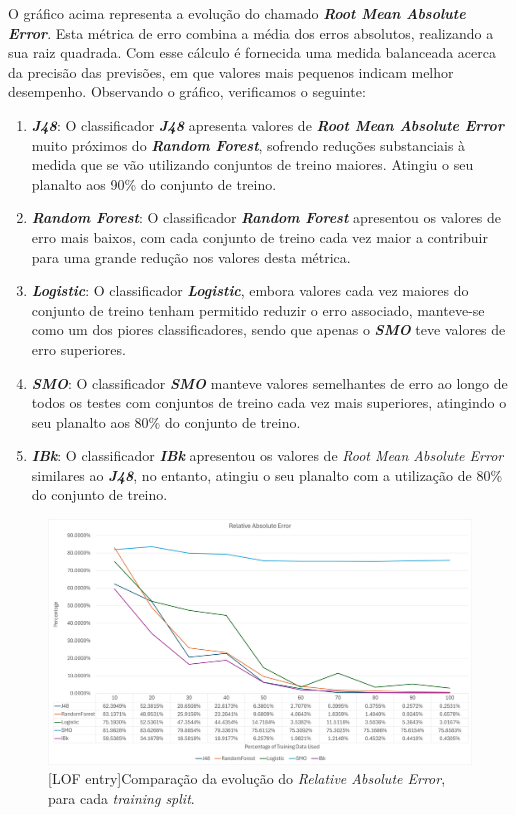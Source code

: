 \documentclass{easychair}
\begin{document}
O gráfico acima representa a evolução do chamado \textit{\textbf{Root Mean Absolute Error}}. Esta métrica de erro combina a média dos erros absolutos, realizando a sua raiz quadrada. Com esse cálculo é fornecida uma medida balanceada acerca da precisão das previsões, em que valores mais pequenos indicam melhor desempenho. Observando o gráfico, verificamos o seguinte:

\begin{enumerate}
	\item \textbf{\textit{J48}}: O classificador \textit{\textbf{J48}} apresenta valores de \textit{\textbf{Root Mean Absolute Error}} muito próximos do \textit{\textbf{Random Forest}}, sofrendo reduções substanciais à medida que se vão utilizando conjuntos de treino maiores. Atingiu o seu planalto aos 90\% do conjunto de treino.
	\item \textbf{\textit{Random Forest}}: O classificador \textit{\textbf{Random Forest}} apresentou os valores de erro mais baixos, com cada conjunto de treino cada vez maior a contribuir para uma grande redução nos valores desta métrica.
	\item \textbf{\textit{Logistic}}: O classificador \textit{\textbf{Logistic}}, embora valores cada vez maiores do conjunto de treino tenham permitido reduzir o erro associado, manteve-se como um dos piores classificadores, sendo que apenas o \textbf{\textit{SMO}} teve valores de erro superiores.
	\item \textbf{\textit{SMO}}: O classificador \textbf{\textit{SMO}} manteve valores semelhantes de erro ao longo de todos os testes com conjuntos de treino cada vez mais superiores, atingindo o seu planalto aos 80\% do conjunto de treino.
	\item \textbf{\textit{IBk}}: O classificador \textit{\textbf{IBk}} apresentou os valores de \textit{Root Mean Absolute Error} similares ao \textbf{\textit{J48}}, no entanto, atingiu o seu planalto com a utilização de 80\% do conjunto de treino. 
\end{enumerate}

\begin{figure}[H]
    \begin{centering}
    \includegraphics[width=1\linewidth]{imagens/figure36.jpg}\label{cap-5-fig36}
    [LOF entry]{Comparação da evolução do \textit{Relative Absolute Error}, para cada \textit{training split}.}
    \label{fig36}
    \end{centering}
\end{figure}
\end{document}
